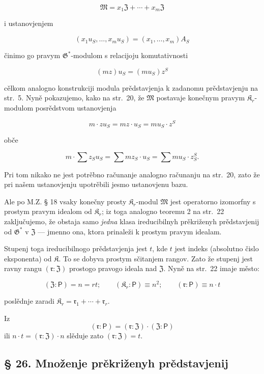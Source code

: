 \documentclass[11pt]{article}
\begin{document}
\[\mathfrak{M}=x_1\mathfrak{Z}+\cdots+x_m\mathfrak{Z}\]

i ustanovjenjem

\[(x_1u_S,\ldots,x_mu_S)=(x_1,\ldots,x_m)A_S\]

činimo go pravym \(\mathfrak G^*\)-modulom s relacijoju komutativnosti

\[(mz) u_S = (mu_S) z^S\]

cělkom analogno konstrukciji modula prědstavjenja k zadanomu prědstavjenju na str.~5. Nyně pokazujemo, kako na str.~20, že \(\mathfrak{M}\) postavaje konečnym pravym \(\mathfrak K_r\)-modulom posrědstvom ustanovjenja

\[m \cdot z u_S = mz \cdot u_S = mu_S \cdot z^S\]

obče

\[m \cdot \sum z_S u_S = \sum m z_S \cdot u_S = \sum m u_S \cdot z_S^S.\]

Pri tom nikako ne jest potrěbno računanje analogno računanju na str.~20, zato že pri našem ustanovjenju upotrěbili jesmo ustanovjenu bazu.

Ale po M.Z. § 18 vsaky konečny prosty \(\mathfrak K_r\)-modul \(\mathfrak{M}\) jest operatorno izomorfny s prostym pravym idealom od \(\mathfrak K_r\); iz toga analogno teoremu 2 na str.~22 zaključujemo, že obstaja samo \emph{jedna} klasa ireducibilnyh prěkriženyh prědstavjenij od \(\mathfrak{G}^*\) v \(\mathfrak Z\) --- jmenno ona, ktora prinaleži k prostym pravym idealam.

Stupenj toga ireducibilnogo prědstavjenja jest \(t\), kde \(t\) jest indeks (absolutno čislo eksponenta) od \(\mathfrak K\). To se dobyva prostym sčitanjem rangov. Zato že stupenj jest ravny rangu \((\mathfrak r:\mathfrak Z)\) prostogo pravogo ideala nad \(\mathfrak Z\). Nyně na str.~22 imaje město:

\[
(\mathfrak Z:\mathsf{P})=n=rt;\qquad (\mathfrak K_r:\mathsf{P})\equiv n^2;\qquad (\mathfrak r:\mathsf{P})\equiv n\cdot t
\]

poslědnje zaradi \(\mathfrak K_r = \mathfrak{r}_1 + \cdots + \mathfrak{r}_r\).

Iz
\[(\mathfrak{r}: \mathsf{P}) = (\mathfrak{r}: \mathfrak Z) \cdot (\mathfrak Z: \mathsf{P})\]
ili \(n \cdot t = (\mathfrak{r}: \mathfrak Z) \cdot n\) slěduje zato \((\mathfrak{r}: \mathfrak Z) = t\).

\subsection*{§ 26. Množenje prěkriženyh prědstavjenij}\label{multiplikation-der-verschraenkten-darstellungen}
\end{document}
